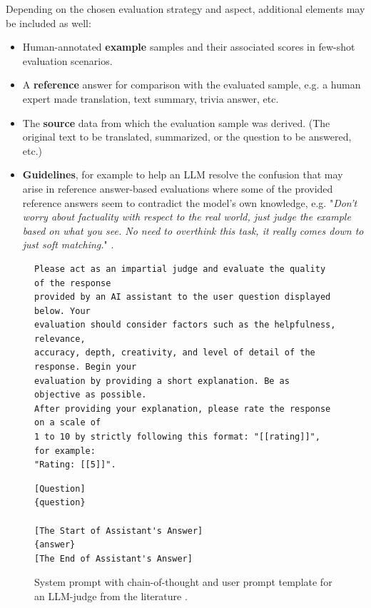 \documentclass[UTF8,noindent,nohyp,parspace,titlepage,a4paper,12pt]{article}
\begin{document}
        Depending on the chosen evaluation strategy and aspect, additional
        elements may be included as well:

        \begin{itemize}
          \item Human-annotated \textbf{example} samples and their associated
                scores in few-shot evaluation scenarios.

          \item A \textbf{reference} answer for comparison with the evaluated
                sample, e.g. a human expert made translation, text summary,
                trivia answer, etc.

          \item The \textbf{source} data from which the evaluation sample was
                derived. (The original text to be translated, summarized, or
                the question to be answered, etc.)

          \item \textbf{Guidelines}, for example to help an LLM resolve the
                confusion that may arise in reference answer-based evaluations
                where some of the provided reference answers seem to contradict
                the model's own knowledge, e.g. "\emph{Don't worry
                about factuality with respect to the real world, just judge the
                example based on what you see.  No need to overthink this task,
                it really comes down to just soft matching.}" \cite{juries}.
        \end{itemize}

        \begin{figure}[hbtp]
          \begin{lstlisting}[basicstyle=\footnotesize\sffamily,frame=single,linewidth=\textwidth]
Please act as an impartial judge and evaluate the quality of the response
provided by an AI assistant to the user question displayed below. Your
evaluation should consider factors such as the helpfulness, relevance,
accuracy, depth, creativity, and level of detail of the response. Begin your
evaluation by providing a short explanation. Be as objective as possible.
After providing your explanation, please rate the response on a scale of
1 to 10 by strictly following this format: "[[rating]]", for example:
"Rating: [[5]]".
          \end{lstlisting}
          \begin{lstlisting}[basicstyle=\footnotesize\sffamily,frame=single,linewidth=\textwidth]
[Question]
{question}

[The Start of Assistant's Answer]
{answer}
[The End of Assistant's Answer]
          \end{lstlisting}
          \caption{%
            System prompt with chain-of-thought and user prompt template for an
            LLM-judge from the literature \cite{arena}.
          }
          \label{figprompt}
        \end{figure}
\end{document}
